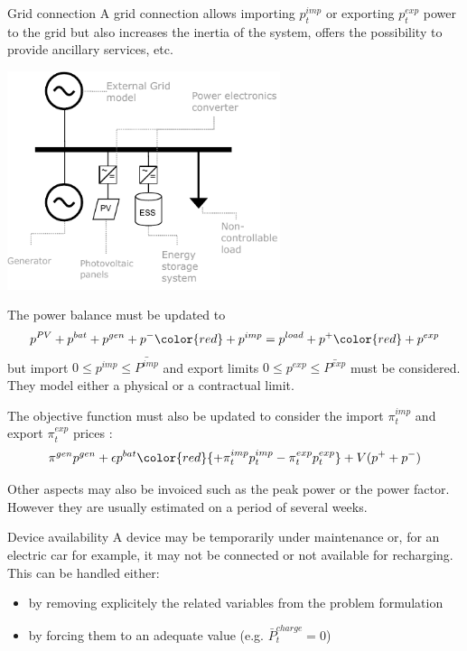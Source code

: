 \begin{frame}[allowframebreaks]{Grid connection}
    A grid connection allows importing $p^{imp}_t$ or exporting $p^{exp}_t$ power to the grid but also increases the inertia of the system, offers the possibility to provide ancillary services, etc.
    \begin{center}
    \includegraphics[width=0.6\textwidth]{images/grid_tied_1.pdf}
    \end{center}
    
    The power balance must be updated to 
    $$p^{PV}+p^{bat} +p^{gen} + p^- {\color{red} + p^{imp}}  = p^{load} + p^+ {\color{red} + p^{exp}} $$
    but import $0 \leq p^{imp} \leq \bar{P^{imp}}$ and export limits $0 \leq p^{exp} \leq \bar{P^{exp}}$ must be considered. 
    They model either a physical or a contractual limit.

    The objective function must also be updated to consider the import $\pi^{imp}_t$ and export $\pi^{exp}_t$ prices : 
    $$\pi^{gen} p^{gen}  + \epsilon p^{bat} {\color{red}{+ \pi^{imp}_t p^{imp}_t - \pi^{exp}_t p^{exp}_t}} + V (p^+ + p^-)$$

    Other aspects may also be invoiced such as the peak power or the power factor. However they are usually estimated on a period of several weeks.
\end{frame}

\begin{frame}{Device availability}
    A device may be temporarily under maintenance or, for an electric car for example, it may not be connected or not available for recharging.
    This can be handled either:
    \begin{itemize}
        \item by removing explicitely the related variables from the problem formulation
        \item by forcing them to an adequate value (e.g. $\bar{P}^{charge}_t = 0$)        
    \end{itemize}
\end{frame}

